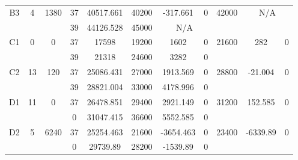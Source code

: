 \begin{sidewaystable}
\begin{tabular}{c||c|c||c|c|c|c|c||c|c|c}
         &
        
      \\
      \hline
      \multirow{2}{*}{B3} &
      \multirow{2}{*}{4} &
      \multirow{2}{*}{1380} &
      37 &
      40517.661 &
      40200 &
        -317.661 &
        0 &
      \multirow{2}{*}{42000} &
        \multicolumn{2}{c}{\multirow{2}{*}{N/A}}
      \\
      \cline{4-8}
       &
       &
       &
      39 &
      44126.528 &
      45000 &
        \multicolumn{2}{|c||}{N/A} &
      
        
      \\
      \hline
      \multirow{2}{*}{C1} &
      \multirow{2}{*}{0} &
      \multirow{2}{*}{0} &
      37 &
      17598 &
      19200 &
        1602 &
        0 &
      \multirow{2}{*}{21600} &
        \multirow{2}{*}{282} &
        \multirow{2}{*}{0}
      \\
      \cline{4-8}
       &
       &
       &
      39 &
      21318 &
      24600 &
        3282 &
        0 &
      
         &
        
      \\
      \hline
      \multirow{2}{*}{C2} &
      \multirow{2}{*}{13} &
      \multirow{2}{*}{120} &
      37 &
      25086.431 &
      27000 &
        1913.569 &
        0 &
      \multirow{2}{*}{28800} &
        \multirow{2}{*}{-21.004} &
        \multirow{2}{*}{0}
      \\
      \cline{4-8}
       &
       &
       &
      39 &
      28821.004 &
      33000 &
        4178.996 &
        0 &
      
         &
        
      \\
      \hline
      \multirow{2}{*}{D1} &
      \multirow{2}{*}{11} &
      \multirow{2}{*}{0} &
      37 &
      26478.851 &
      29400 &
        2921.149 &
        0 &
      \multirow{2}{*}{31200} &
        \multirow{2}{*}{152.585} &
        \multirow{2}{*}{0}
      \\
      \cline{4-8}
       &
       &
       &
      0 &
      31047.415 &
      36600 &
        5552.585 &
        0 &
      
         &
        
      \\
      \hline
      \multirow{2}{*}{D2} &
      \multirow{2}{*}{5} &
      \multirow{2}{*}{6240} &
      37 &
      25254.463 &
      21600 &
        -3654.463 &
        0 &
      \multirow{2}{*}{23400} &
        \multirow{2}{*}{-6339.89} &
        \multirow{2}{*}{0}
      \\
      \cline{4-8}
       &
       &
       &
      0 &
      29739.89 &
      28200 &
        -1539.89 &
        0 &
      

\end{tabular}
\end{sidewaystable}
